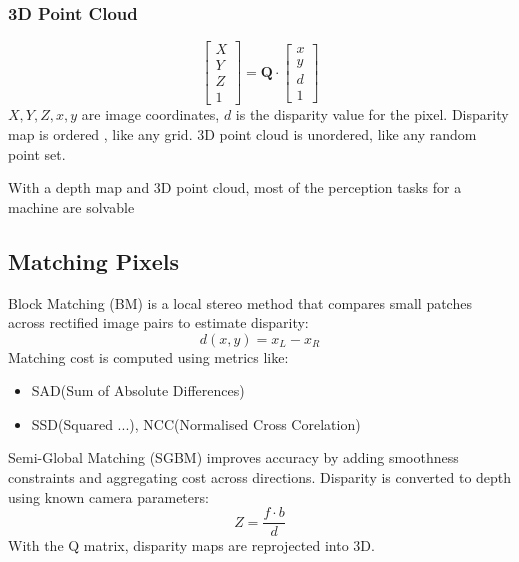 \subsubsection{3D Point Cloud}
\[
\begin{bmatrix}
    X\\
    Y\\
    Z\\
    1
\end{bmatrix}
= \mathbf{Q} \cdot
\begin{bmatrix}
    x\\
    y\\
    d\\
    1
\end{bmatrix}
\]
\(X,Y,Z,x,y\) are image coordinates, \(d\) is the disparity value for the pixel.
Disparity map is ordered , like any grid. 3D point cloud is unordered, like any random point set.

With a depth map and 3D point cloud, most of the perception tasks for a machine are solvable
\subsection{Matching Pixels}
Block Matching (BM) is a local stereo method that compares small patches across rectified image pairs to estimate disparity:
\[
d(x,y) = x_L - x_R
\]
Matching cost is computed using metrics like:
\begin{itemize}
    \item SAD(Sum of Absolute Differences)
    \item SSD(Squared ...), NCC(Normalised Cross Corelation)
\end{itemize}
Semi-Global Matching (SGBM) improves accuracy by adding smoothness constraints and aggregating cost across directions.
Disparity is converted to depth using known camera parameters:
\[
Z = \frac{f\cdot b}{d}
\]
With the Q matrix, disparity maps are reprojected into 3D.
